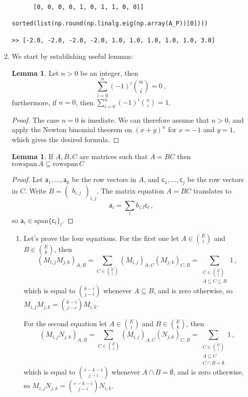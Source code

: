 \documentclass[kulak]{tplt}
\theoremstyle{definition}
\newtheorem{lm}[thm]{Lemma}
\newcommand{\va}{\mathsf{a}}
\newcommand{\vc}{\mathsf{c}}
\newcommand{\spn}{\mathrm{span}}
\newcommand{\rowspn}{\mathrm{rowspan}}
\begin{document}
\begin{enumerate}
\begin{verbatim}
      [0, 0, 0, 0, 1, 0, 1, 1, 0, 0]]

sorted(list(np.round(np.linalg.eig(np.array(A_P))[0])))

>> [-2.0, -2.0, -2.0, -2.0, 1.0, 1.0, 1.0, 1.0, 1.0, 3.0]
\end{verbatim}

\item 
We start by establishing useful lemmas:
\begin{lm}\label{lm:binsum}
Let $n> 0$ be an integer, then
$$ \sum_{i=0}^n (-1)^i\binom{n}{i} = 0 \, ,$$
furthermore, if $n=0$, then $\sum_{i=0}^n (-1)^i\binom{n}{i} = 1$.
\end{lm}

\begin{proof}
The case $n=0$ is imediate.
We can therefore assume that $n>0$, and apply the Newton binomial theorem on $(x+y)^n$ for $x = -1$ and $y = 1$, which gives the desired formula. 
\end{proof}


\begin{lm}\label{lm:rowspan}
If $A, B, C$ are matrices such that $A = BC$ then $\rowspn \, A \subseteq \rowspn \, C$
\end{lm}

\begin{proof}
Let $\va_1, \ldots , \va_k$ be the row vectors in $A$, and $\vc_1, \ldots, \vc_j$ be the row vectors in $C$.
Write $B = \begin{pmatrix}
b_{i, j}
\end{pmatrix}_{i, j}$.
The matrix equation $A = BC$ translates to
$$ \va_i = \sum_l b_{i, l} \vc_l \, ,$$
so $\va_i \in \spn \{\vc_l\}_l$.
\end{proof}

\begin{enumerate}
\item 
Let's prove the four equations.
For the first one let $A \in \binom{E}{i}$ and $B \in \binom{E}{k}$, then
$$(M_{i, j} M_{j, k})_{A, B} = \sum_{C \in \binom{E}{j}} (M_{i, j})_{A, C}( M_{j, k})_{C, B} = \sum_{\substack{C \in \binom{E}{j} \\ A \subseteq C \subseteq B }} 1\, ,$$
which is equal to $\binom{k-i}{j-i}$ whenever $A\subseteq B$, and is zero otherwise, so
$M_{i, j} M_{j, k} = \binom{k-i}{j-i}M_{i, k}$.

For the second equation let $A \in \binom{E}{i}$ and $B \in \binom{E}{k}$, then
$$(M_{i, j} N_{j, k})_{A, B} = \sum_{C \in \binom{E}{j}} (M_{i, j})_{A, C}( N_{j, k})_{C, B} = \sum_{\substack{C \in \binom{E}{j} \\ A \subseteq C \\ C \cap B = \emptyset }} 1 \, ,
$$
which is equal to $\binom{e-k-i}{j-i}$ whenever $A\cap B = \emptyset $, and is zero otherwise, so
$M_{i, j} N_{j, k} = \binom{e-k-i}{j-i}N_{i, k}$.


\end{enumerate}
\end{enumerate}
\end{document}
